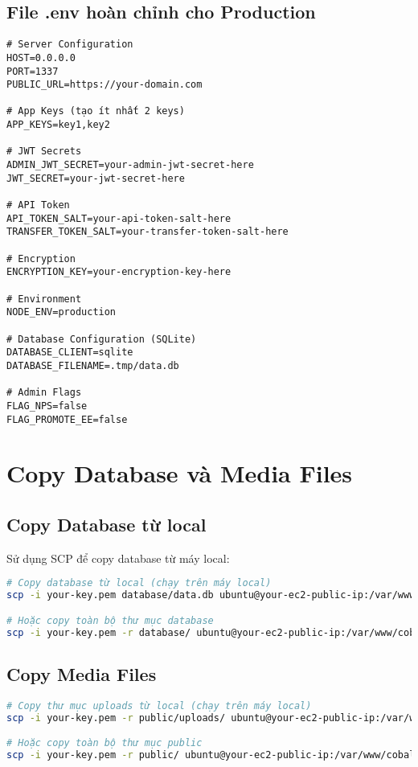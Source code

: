 \documentclass[12pt,a4paper]{article}
\begin{document}
\subsection{File .env hoàn chỉnh cho Production}
\begin{lstlisting}[language=plaintext]
# Server Configuration
HOST=0.0.0.0
PORT=1337
PUBLIC_URL=https://your-domain.com

# App Keys (tạo ít nhất 2 keys)
APP_KEYS=key1,key2

# JWT Secrets
ADMIN_JWT_SECRET=your-admin-jwt-secret-here
JWT_SECRET=your-jwt-secret-here

# API Token
API_TOKEN_SALT=your-api-token-salt-here
TRANSFER_TOKEN_SALT=your-transfer-token-salt-here

# Encryption
ENCRYPTION_KEY=your-encryption-key-here

# Environment
NODE_ENV=production

# Database Configuration (SQLite)
DATABASE_CLIENT=sqlite
DATABASE_FILENAME=.tmp/data.db

# Admin Flags
FLAG_NPS=false
FLAG_PROMOTE_EE=false
\end{lstlisting}

\section{Copy Database và Media Files}

\subsection{Copy Database từ local}
Sử dụng SCP để copy database từ máy local:
\begin{lstlisting}[language=bash]
# Copy database từ local (chạy trên máy local)
scp -i your-key.pem database/data.db ubuntu@your-ec2-public-ip:/var/www/cobalt-cms/.tmp/

# Hoặc copy toàn bộ thư mục database
scp -i your-key.pem -r database/ ubuntu@your-ec2-public-ip:/var/www/cobalt-cms/
\end{lstlisting}

\subsection{Copy Media Files}
\begin{lstlisting}[language=bash]
# Copy thư mục uploads từ local (chạy trên máy local)
scp -i your-key.pem -r public/uploads/ ubuntu@your-ec2-public-ip:/var/www/cobalt-cms/public/

# Hoặc copy toàn bộ thư mục public
scp -i your-key.pem -r public/ ubuntu@your-ec2-public-ip:/var/www/cobalt-cms/
\end{lstlisting}
\end{document}
